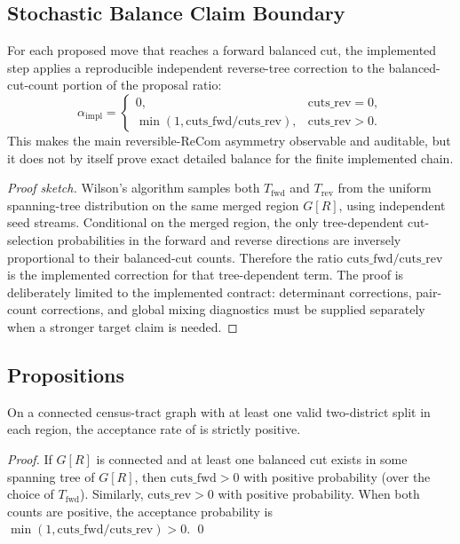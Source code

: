 \subsection{Stochastic Balance Claim Boundary}

\begin{proposition}
\label{thm:approx-balance}
For each proposed move that reaches a forward balanced cut, the implemented
\mergesplit{} step applies a reproducible independent reverse-tree correction
to the balanced-cut-count portion of the proposal ratio:
\[
  \alpha_{\mathrm{impl}} =
  \begin{cases}
    0, & \mathrm{cuts\_rev}=0,\\
    \min(1,\mathrm{cuts\_fwd}/\mathrm{cuts\_rev}), & \mathrm{cuts\_rev}>0.
  \end{cases}
\]
This makes the main reversible-ReCom asymmetry observable and auditable, but it
does not by itself prove exact detailed balance for the finite implemented
chain.
\end{proposition}

\begin{proof}[Proof sketch]
Wilson's algorithm samples both $T_{\mathrm{fwd}}$ and $T_{\mathrm{rev}}$
from the uniform spanning-tree distribution on the same merged region $G[R]$,
using independent seed streams.  Conditional on the merged region, the only
tree-dependent cut-selection probabilities in the forward and reverse
directions are inversely proportional to their balanced-cut counts.  Therefore
the ratio $\mathrm{cuts\_fwd}/\mathrm{cuts\_rev}$ is the implemented correction
for that tree-dependent term.  The proof is deliberately limited to the
implemented contract: determinant corrections, pair-count corrections, and
global mixing diagnostics must be supplied separately when a stronger target
claim is needed.
\end{proof}

\subsection{Propositions}

\begin{proposition}
\label{prop:positive-accept}
On a connected census-tract graph with at least one valid two-district
split in each region, the acceptance rate of \mergesplit{} is strictly
positive.
\end{proposition}

\begin{proof}
If $G[R]$ is connected and at least one balanced cut exists in some
spanning tree of $G[R]$, then $\mathrm{cuts\_fwd} > 0$ with positive
probability (over the choice of $T_{\mathrm{fwd}}$).
Similarly, $\mathrm{cuts\_rev} > 0$ with positive probability.
When both counts are positive, the acceptance probability is
$\min(1, \mathrm{cuts\_fwd}/\mathrm{cuts\_rev}) > 0$. \qed
\end{proof}

